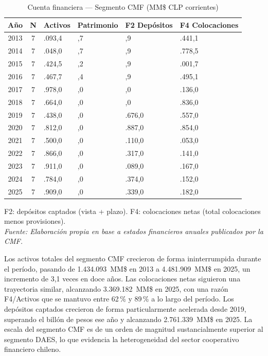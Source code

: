 \begin{table}[H]
\centering
\caption{Cuenta financiera --- Segmento CMF (MM\$ CLP corrientes)}
\label{tab:balance_cmf}
\small
\renewcommand{\arraystretch}{1.4}
\begin{tabularx}{\textwidth}{@{} c c >{\raggedleft\arraybackslash}X >{\raggedleft\arraybackslash}X >{\raggedleft\arraybackslash}X >{\raggedleft\arraybackslash}X @{}}
\toprule
\textbf{Año} & \textbf{N} &
\textbf{Activos} & \textbf{Patrimonio} &
\textbf{F2 Depósitos} & \textbf{F4 Colocaciones} \\
\midrule
2013 & 7 & 1.434.093,4 & 439.510,7 &   709.177,9 & 1.274.441,1 \\
2014 & 7 & 1.432.048,0 & 449.722,7 &   716.124,9 & 1.266.778,5 \\
2015 & 7 & 1.529.424,5 & 491.407,2 &   742.253,9 & 1.331.001,7 \\
2016 & 7 & 1.666.467,7 & 533.773,4 &   845.168,9 & 1.417.495,1 \\
2017 & 7 & 1.810.978,0 & 510.013,0 &   849.926,0 & 1.563.136,0 \\
2018 & 7 & 1.981.664,0 & 538.757,0 &   925.938,0 & 1.669.836,0 \\
2019 & 7 & 2.196.438,0 & 577.075,0 & 1.046.676,0 & 1.816.557,0 \\
2020 & 7 & 2.539.812,0 & 622.202,0 & 1.335.887,0 & 1.845.854,0 \\
2021 & 7 & 2.797.500,0 & 633.926,0 & 1.659.110,0 & 1.898.053,0 \\
2022 & 7 & 3.148.866,0 & 754.875,0 & 1.851.317,0 & 2.320.141,0 \\
2023 & 7 & 3.570.911,0 & 780.738,0 & 2.227.089,0 & 2.709.167,0 \\
2024 & 7 & 4.056.784,0 & 862.532,0 & 2.536.374,0 & 3.042.152,0 \\
2025 & 7 & 4.481.909,0 & 915.240,0 & 2.761.339,0 & 3.369.182,0 \\
\bottomrule
\end{tabularx}
\vspace{0.4em}
{\footnotesize
F2: depósitos captados (vista + plazo). F4: colocaciones netas
(total colocaciones menos provisiones).\\
\textit{Fuente: Elaboración propia en base a estados financieros
anuales publicados por la CMF.}}
\end{table}

Los activos totales del segmento CMF crecieron de forma
ininterrumpida durante el período, pasando de 1.434.093~MM\$
en 2013 a 4.481.909~MM\$ en 2025, un incremento de 3,1 veces
en doce años. Las colocaciones netas siguieron una trayectoria
similar, alcanzando 3.369.182~MM\$ en 2025, con una razón
F4/Activos que se mantuvo entre 62\,\% y 89\,\% a lo largo
del período. Los depósitos captados crecieron de forma
particularmente acelerada desde 2019, superando el billón
de pesos ese año y alcanzando 2.761.339~MM\$ en 2025.
La escala del segmento CMF es de un orden de magnitud
sustancialmente superior al segmento DAES, lo que evidencia
la heterogeneidad del sector cooperativo financiero chileno.


